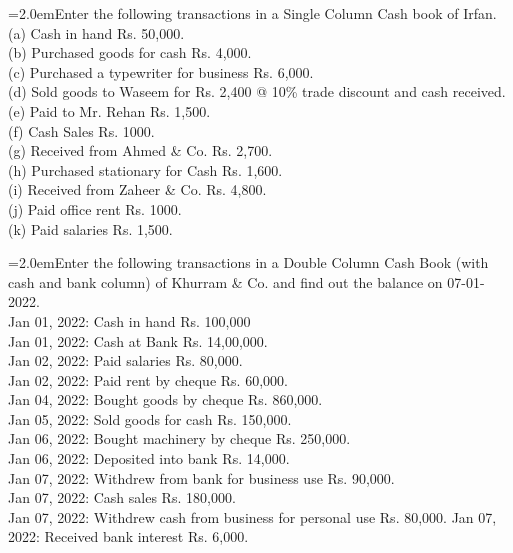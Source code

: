 \documentclass[11pt,a4paper]{article}
\newcommand{\lqn}[2]{\Needspace{6\baselineskip}\par\medskip\noindent\hangindent=2.0em\hangafter=1\makebox[2.0em][l]{\textbf{#1.}}#2\par}
\begin{document}
\lqn{58}{Enter the following transactions in a Single Column Cash book of Irfan.\\
(a) Cash in hand Rs. 50,000.\\
(b) Purchased goods for cash Rs. 4,000.\\
(c) Purchased a typewriter for business Rs. 6,000.\\
(d) Sold goods to Waseem for Rs. 2,400 @ 10\% trade discount and cash received.\\
(e) Paid to Mr. Rehan Rs. 1,500.\\
(f) Cash Sales Rs. 1000.\\
(g) Received from Ahmed \& Co. Rs. 2,700.\\
(h) Purchased stationary for Cash Rs. 1,600.\\
(i) Received from Zaheer \& Co. Rs. 4,800.\\
(j) Paid office rent Rs. 1000.\\
(k) Paid salaries Rs. 1,500.\par
}
\lqn{59}{Enter the following transactions in a Double Column Cash Book (with cash and bank column) of Khurram \& Co. and find out the balance on 07-01-2022.\\
Jan 01, 2022:    Cash in hand Rs. 100,000\\
Jan 01, 2022:    Cash at Bank Rs. 14,00,000.\\
Jan 02, 2022:    Paid salaries Rs. 80,000.\\
Jan 02, 2022:    Paid rent by cheque Rs. 60,000.\\
Jan 04, 2022:    Bought goods by cheque Rs. 860,000.\\
Jan 05, 2022:    Sold goods for cash Rs. 150,000.\\
Jan 06, 2022:    Bought machinery by cheque Rs. 250,000.\\
Jan 06, 2022:    Deposited into bank Rs. 14,000.\\
Jan 07, 2022:    Withdrew from bank for business use Rs. 90,000.\\
Jan 07, 2022:    Cash sales Rs. 180,000.\\
Jan 07, 2022:    Withdrew cash from business for personal use Rs. 80,000. Jan 07, 2022:    Received bank interest Rs. 6,000.\par
}
\end{document}
